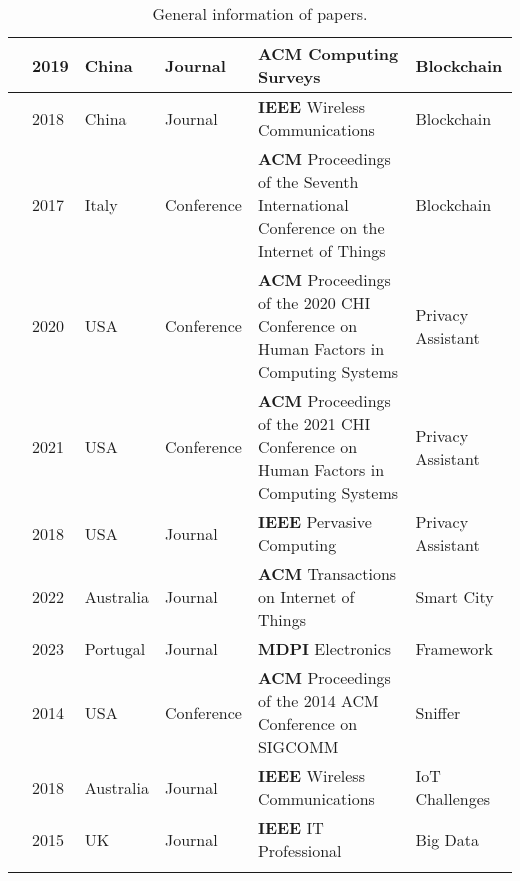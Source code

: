 \begin{footnotesize}
\begin{longtable}{p{1.2cm} p{1cm} p{1.6cm} p{3.2cm} p{5cm} p{3cm}}
        \cite{zhang2019security} & 2019 & China & Journal & \textbf{ACM} Computing Surveys & Blockchain \\
        \hline
        \cite{yu2018blockchain} & 2018 & China & Journal & \textbf{IEEE} Wireless Communications & Blockchain \\
        \hline
        \cite{AliIoT} & 2017 & Italy & Conference & \textbf{ACM} Proceedings of the Seventh International Conference on the Internet of Things & Blockchain \\
        \hline
        \cite{ColnagoInforming} & 2020 & USA & Conference & \textbf{ACM} Proceedings of the 2020 CHI Conference on Human Factors in Computing Systems & Privacy Assistant \\
        \hline
        \cite{FengDesign} & 2021 & USA & Conference & \textbf{ACM} Proceedings of the 2021 CHI Conference on Human Factors in Computing Systems & Privacy Assistant \\
        \hline
        \cite{DasPersonalized} & 2018 & USA & Journal & \textbf{IEEE} Pervasive Computing & Privacy Assistant \\
        \hline
        \cite{ZhuIntegrating} & 2022 & Australia & Journal & \textbf{ACM} Transactions on Internet of Things & Smart City \\
        \hline
        \cite{electronics12122589} & 2023 & Portugal & Journal & \textbf{MDPI} Electronics & Framework \\
        \hline
        \cite{KumarLTE} & 2014 & USA & Conference & \textbf{ACM} Proceedings of the 2014 ACM Conference on SIGCOMM & Sniffer \\
        \hline
        \cite{Qu2018Privacy} & 2018 & Australia & Journal & \textbf{IEEE} Wireless Communications & IoT Challenges \\
        \hline
        \cite{perera2015big} & 2015 & UK & Journal & \textbf{IEEE} IT Professional & Big Data \\
        \hline
        \caption{General information of papers.}
        \label{table:literature_overview}
    \end{longtable}
\end{footnotesize}

